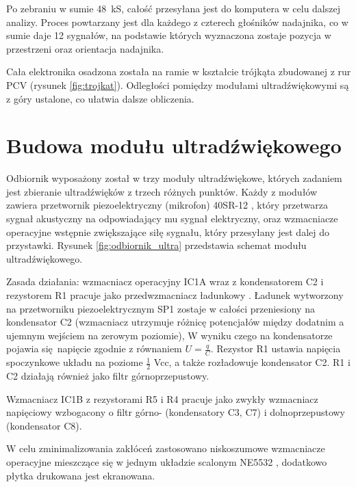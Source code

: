 Po zebraniu w sumie \SI{48}{kS}, całość przesyłana jest do komputera w celu dalszej analizy.
Proces powtarzany jest dla każdego z czterech głośników nadajnika, 
co w sumie daje 12 sygnałów, na podstawie których wyznaczona zostaje 
pozycja w przestrzeni oraz orientacja nadajnika.

Cała elektronika osadzona została na ramie w kształcie trójkąta zbudowanej z rur PCV  (rysunek \ref{fig:trojkat}). 
Odległości pomiędzy modułami ultradźwiękowymi są z góry ustalone, co ułatwia dalsze obliczenia.




\clearpage
\section{Budowa modułu ultradźwiękowego}

Odbiornik wyposażony został w trzy moduły ultradźwiękowe, których zadaniem jest 
zbieranie ultradźwięków z trzech różnych  punktów.
Każdy z modułów zawiera przetwornik piezoelektryczny (mikrofon) 40SR-12 \cite{bib:40ST12},
który przetwarza sygnał akustyczny na odpowiadający mu sygnał elektryczny, oraz wzmacniacze operacyjne 
wstępnie zwiększające siłę sygnału, który przesyłany jest dalej do przystawki.
Rysunek \ref{fig:odbiornik_ultra} przedstawia schemat modułu ultradźwiękowego.


Zasada działania: wzmacniacz operacyjny IC1A wraz z kondensatorem C2 i rezystorem R1 pracuje 
jako przedwzmacniacz ładunkowy \cite{bib:wzm_ladunkowy}.
Ładunek wytworzony na przetworniku piezoelektrycznym SP1 zostaje w całości przeniesiony na kondensator C2 
(wzmacniacz utrzymuje różnicę potencjałów między dodatnim a ujemnym wejściem na zerowym poziomie),
W wyniku czego na kondensatorze pojawia się napięcie zgodnie z równaniem $U=\frac{q}{C}$.
Rezystor R1 ustawia napięcia spoczynkowe układu na poziome $\frac{1}{2}$ Vcc, a także rozładowuje kondensator C2.
R1 i C2 działają również jako filtr górnoprzepustowy.

Wzmacniacz IC1B z rezystorami R5 i R4 pracuje jako zwykły wzmacniacz napięciowy wzbogacony o 
filtr górno- (kondensatory C3, C7) i dolnoprzepustowy 
(kondensator C8).

W celu zminimalizowania zakłóceń zastosowano niskoszumowe wzmacniacze operacyjne
mieszczące się w jednym układzie scalonym NE5532 \cite{bib:ne5532}, 
dodatkowo płytka drukowana jest ekranowana.

